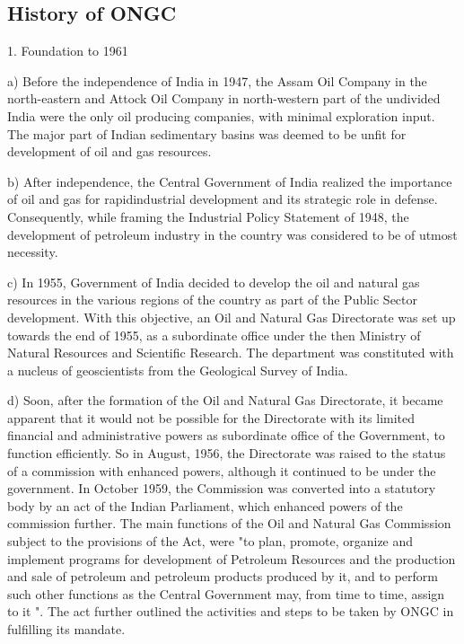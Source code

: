 \documentclass[11pt,a4paper]{article}
\begin{document}
\subsection{\textbf{History of ONGC}}

1. Foundation to 1961

a) Before the independence of India in 1947, the Assam Oil Company in the north-eastern and Attock Oil Company in north-western part of the undivided India
were the only oil producing companies, with minimal exploration input. The major part of Indian sedimentary basins was deemed to be unfit for development of oil
and gas resources.

b) After independence, the Central Government of India realized the importance of oil and gas for rapidindustrial development and its strategic role in defense.
Consequently, while framing the Industrial Policy Statement of 1948, the development of petroleum industry in the country was considered to be of utmost
necessity.

c) In 1955, Government of India decided to develop the oil and natural gas resources in the various regions of the country as part of the Public Sector development. With this objective, an Oil and Natural Gas Directorate was set up towards the end of 1955, as a subordinate office under the then Ministry of Natural Resources and
Scientific Research. The department was constituted with a nucleus of geoscientists from the Geological Survey of India.

d) Soon, after the formation of the Oil and Natural Gas Directorate, it became apparent that it would not be possible for the Directorate with its limited financial and administrative powers as subordinate office of the Government, to function efficiently. So in August, 1956, the Directorate was raised to the status of a commission with enhanced powers, although it continued to be under the government. In October 1959, the Commission was converted into a statutory body by an act of the Indian Parliament, which enhanced powers of the commission further. The main functions of the Oil and Natural Gas Commission subject to the provisions of the Act, were "to plan, promote, organize and implement programs for development of Petroleum Resources and the production and sale of petroleum and petroleum products produced by it, and to perform such other functions as the Central Government may, from time to time, assign to it ". The act further outlined the activities and steps to be taken by ONGC in fulfilling its mandate.
\end{document}

